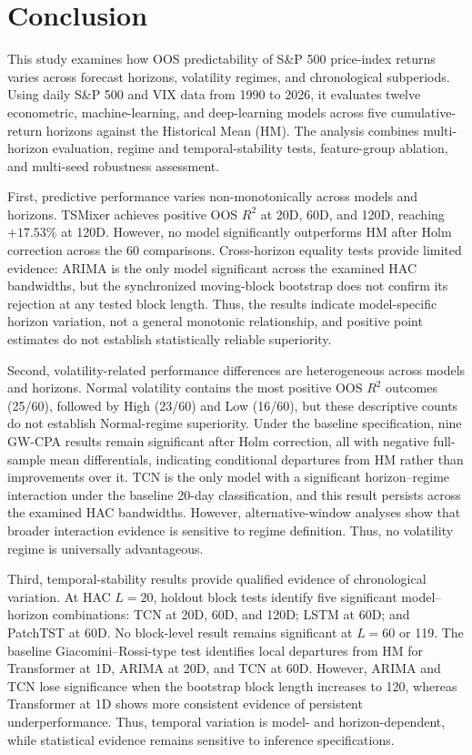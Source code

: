 \documentclass[runningheads,orivec]{llncs}
\begin{document}
\section{Conclusion}\label{sec:conclusion}

This study examines how OOS predictability of S\&P 500 price-index returns varies across forecast horizons, volatility regimes, and chronological subperiods. Using daily S\&P 500 and VIX data from 1990 to 2026, it evaluates twelve econometric, machine-learning, and deep-learning models across five cumulative-return horizons against the Historical Mean (HM). The analysis combines multi-horizon evaluation, regime and temporal-stability tests, feature-group ablation, and multi-seed robustness assessment.

First, predictive performance varies non-monotonically across models and horizons. TSMixer achieves positive OOS $R^2$ at 20D, 60D, and 120D, reaching $+17.53\%$ at 120D. However, no model significantly outperforms HM after Holm correction across the 60 comparisons. Cross-horizon equality tests provide limited evidence: ARIMA is the only model significant across the examined HAC bandwidths, but the synchronized moving-block bootstrap does not confirm its rejection at any tested block length. Thus, the results indicate model-specific horizon variation, not a general monotonic relationship, and positive point estimates do not establish statistically reliable superiority.

Second, volatility-related performance differences are heterogeneous across models and horizons. Normal volatility contains the most positive OOS $R^2$ outcomes (25/60), followed by High (23/60) and Low (16/60), but these descriptive counts do not establish Normal-regime superiority. Under the baseline specification, nine GW-CPA results remain significant after Holm correction, all with negative full-sample mean differentials, indicating conditional departures from HM rather than improvements over it. TCN is the only model with a significant horizon--regime interaction under the baseline 20-day classification, and this result persists across the examined HAC bandwidths. However, alternative-window analyses show that broader interaction evidence is sensitive to regime definition. Thus, no volatility regime is universally advantageous.

Third, temporal-stability results provide qualified evidence of chronological variation. At HAC $L=20$, holdout block tests identify five significant model--horizon combinations: TCN at 20D, 60D, and 120D; LSTM at 60D; and PatchTST at 60D. No block-level result remains significant at $L=60$ or 119. The baseline Giacomini--Rossi-type test identifies local departures from HM for Transformer at 1D, ARIMA at 20D, and TCN at 60D. However, ARIMA and TCN lose significance when the bootstrap block length increases to 120, whereas Transformer at 1D shows more consistent evidence of persistent underperformance. Thus, temporal variation is model- and horizon-dependent, while statistical evidence remains sensitive to inference specifications.
\end{document}

